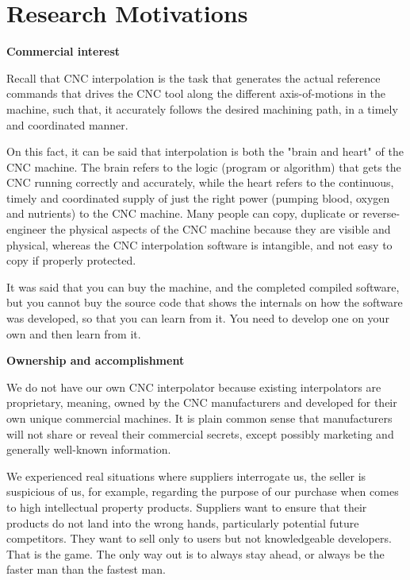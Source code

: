 \justifying
\pagebreak
\section{Research Motivations}

\textbf{Commercial interest}
\vspace*{1\baselineskip}

Recall that CNC interpolation is the task that generates the actual reference commands that drives the CNC tool along the different axis-of-motions in the machine, such that, it accurately follows the desired machining path, in a timely and coordinated manner.
\vspace*{1\baselineskip}

On this fact, it can be said that interpolation is both the "brain and heart" of the CNC machine. The brain refers to the logic (program or algorithm) that gets the CNC running correctly and accurately, while the heart refers to the continuous, timely and coordinated supply of just the right power (pumping blood, oxygen and nutrients) to the CNC machine. Many people can copy, duplicate or reverse-engineer the physical aspects of the CNC machine because they are visible and physical, whereas the CNC interpolation software is intangible, and not easy to copy if properly protected. 
\vspace*{1\baselineskip}

\begin{tcolorbox}[colback=green!15!white,colframe=red!75!black,title=Research consideration no. 1]	
It was said that you can buy the machine, and the completed compiled software, but you cannot buy the source code that shows the internals on how the software was developed, so that you can learn from it. You need to develop one on your own and then learn from it.   
\end{tcolorbox}

\textbf{Ownership and accomplishment}
\vspace*{1\baselineskip}
	
We do not have our own CNC interpolator because existing interpolators are proprietary, meaning, owned by the CNC manufacturers and developed for their own unique commercial machines. It is plain common sense that manufacturers will not share or reveal their commercial secrets, except possibly marketing and generally well-known information. 
\vspace*{1\baselineskip}

We experienced real situations where suppliers interrogate us, the seller is suspicious of us, for example, regarding the purpose of our purchase when comes to high intellectual property products. Suppliers want to ensure that their products do not land into the wrong hands, particularly potential future competitors. They want to sell only to users but not knowledgeable developers. That is the game. The only way out is to always stay ahead, or always be the faster man than the fastest man.

